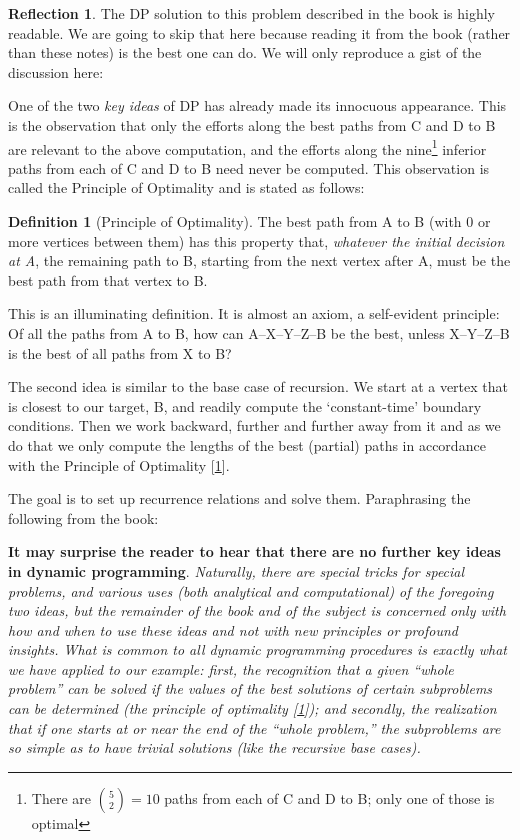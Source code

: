 \documentclass[english,notitlepage,smartquotes]{hgbreport}
\theoremstyle{definition}
\newtheorem{definition}{Definition}
\theoremstyle{definition}
\theoremstyle{remark}
\theoremstyle{definition}
\theoremstyle{plain}
\theoremstyle{definition}
\newtheorem{reflection}{Reflection}
\begin{document}
\begin{reflection}
The DP solution to this problem described in the book is highly readable. We are going to skip that here because reading it from the book (rather than these notes) is the best one can do. We will only reproduce a gist of the discussion here:
\begin{sidebar}
One of the two \emph{key ideas} of DP has already made its innocuous appearance. This is the observation that only the efforts along the best paths from C and D to B are relevant to the above computation, and the efforts along the nine\footnote{There are ${5\choose 2}=10$ paths from each of C and D to B; only one of those is optimal} inferior paths from each of C and D to B need never be computed. This observation is called the Principle of Optimality and is stated as follows:
\begin{definition}[Principle of Optimality]
\label{def:poopt}
The best path from A to B (with 0 or more vertices between them) has this property that, \emph{whatever the initial decision at A}, the remaining path to B, starting from the next vertex after A, must be the best path from that vertex to B.
\end{definition}

This is an illuminating definition. It is almost an axiom, a self-evident principle: Of all the paths from A to B, how can A--X--Y--Z--B be the best, unless X--Y--Z--B is the best of all paths from X to B?

The second idea is similar to the base case of recursion. We start at a vertex that is closest to our target, B, and readily compute the `constant-time' boundary conditions. Then we work backward, further and further away from it and as we do that we only compute the lengths of the best (partial) paths in accordance with the Principle of Optimality [\ref{def:poopt}]. 

The goal is to set up recurrence relations and solve them. Paraphrasing the following from the book:

\textbf{It may surprise the reader to hear that there are no further key ideas in dynamic programming}. \emph{Naturally, there are special tricks for special problems, and various uses (both analytical and computational) of the foregoing two ideas, but the remainder of the book and of the subject is concerned only with how and when to use these ideas and not with new principles or profound insights. What is common to all dynamic programming procedures is exactly what we have applied to our example: first, the recognition that a given “whole problem” can be solved if the values of the best solutions of certain subproblems can be determined (the principle of optimality [\ref{def:poopt}]); and secondly, the realization that if one starts at or near the end of the ``whole problem,'' the subproblems are so simple as to have trivial solutions (like the recursive base cases).}
\end{sidebar}
\end{reflection}
\end{document}
